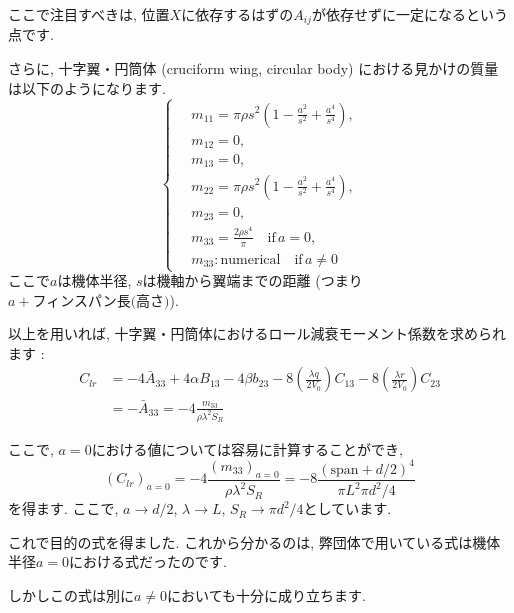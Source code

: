 \documentclass[uplatex,dvipdfmx,a4j,11  pt]{jsarticle}
\begin{document}
ここで注目すべきは, 位置$X$に依存するはずの$A_{ij}$が依存せずに一定になるという点です.

さらに, 十字翼・円筒体 (cruciform wing, circular body) における見かけの質量は以下のようになります.
\begin{equation}
  \left\{ 
  \begin{alignedat}{2}
    \,&m_{11} = \pi \rho s^2 \left(1 - \frac{a^2}{s^2} + \frac{a^4}{s^4}\right),\\
    \,&m_{12} = 0,\\
    \,&m_{13} = 0,\\
    \,&m_{22} = \pi \rho s^2 \left(1 - \frac{a^2}{s^2} + \frac{a^4}{s^4}\right),\\
    \,&m_{23} = 0,\\
    \,&m_{33} = \frac{2\rho s^4}{\pi}\quad  \text{if}\, a = 0,\\
    \,&m_{33} : \text{numerical}\quad \text{if}\, a \ne 0
  \end{alignedat} 
  \right.
\end{equation}
ここで$a$は機体半径, $s$は機軸から翼端までの距離 (つまり$a + \text{フィンスパン長(高さ)}$).

以上を用いれば, 十字翼・円筒体におけるロール減衰モーメント係数を求められます :
\begin{align}
  C_{lr} &= -4 \bar{A}_{33} + 4 \alpha B_{13} - 4 \beta b_{23} - 8 \left(\frac{\lambda q}{2 V_0}\right) C_{13} - 8 \left(\frac{\lambda r}{2V_0}\right) C_{23}\nonumber\\
  &= -\bar{A}_{33} = -4\frac{m_{33}}{\rho\lambda^2 S_R}
\end{align}

ここで, $a = 0$における値については容易に計算することができ,
\begin{equation}
  (C_{lr})_{a = 0} =  -4\frac{(m_{33})_{a = 0}}{\rho\lambda^2 S_R}= -8 \frac{(\text{span} + d/2)^4}{\pi L^2 \pi d^2/4}
\end{equation}
を得ます.
ここで, $a \to d / 2$, $\lambda \to L$, $S_R \to \pi d^2/4$としています.

これで目的の式を得ました.
これから分かるのは, 弊団体で用いている式は機体半径$a = 0$における式だったのです.

\enskip

しかしこの式は別に$a \ne 0$においても十分に成り立ちます.
\end{document}
